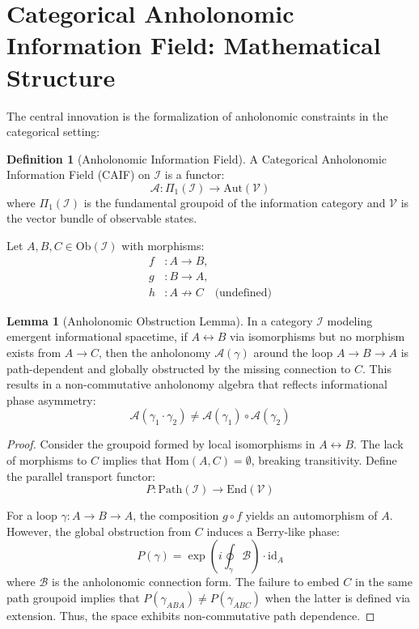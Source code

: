 \documentclass[11pt]{article}
\theoremstyle{definition}
\newtheorem{definition}{Definition}[section]
\newtheorem{lemma}{Lemma}[section]
\theoremstyle{remark}
\begin{document}
\section{Categorical Anholonomic Information Field: Mathematical Structure}

The central innovation is the formalization of anholonomic constraints in the categorical setting:

\begin{definition}[Anholonomic Information Field]
A Categorical Anholonomic Information Field (CAIF) on \( \mathcal{I} \) is a functor:
\[ \mathcal{A}: \Pi_1(\mathcal{I}) \to \text{Aut}(\mathcal{V}) \]
where \( \Pi_1(\mathcal{I}) \) is the fundamental groupoid of the information category and \( \mathcal{V} \) is the vector bundle of observable states.
\end{definition}

Let \( A, B, C \in \text{Ob}(\mathcal{I}) \) with morphisms:
\begin{align*}
  f &: A \to B, \\
  g &: B \to A, \\
  h &: A \nrightarrow C \quad \text{(undefined)}
\end{align*}

\begin{lemma}[Anholonomic Obstruction Lemma]
In a category \( \mathcal{I} \) modeling emergent informational spacetime, if \( A \leftrightarrow B \) via isomorphisms but no morphism exists from \( A \to C \), then the anholonomy \( \mathcal{A}(\gamma) \) around the loop \( A \to B \to A \) is path-dependent and globally obstructed by the missing connection to \( C \). This results in a non-commutative anholonomy algebra that reflects informational phase asymmetry:
\[ \mathcal{A}(\gamma_1 \cdot \gamma_2) \neq \mathcal{A}(\gamma_1) \circ \mathcal{A}(\gamma_2) \]
\end{lemma}

\begin{proof}
Consider the groupoid formed by local isomorphisms in \( A \leftrightarrow B \). The lack of morphisms to \( C \) implies that \( \text{Hom}(A, C) = \emptyset \), breaking transitivity. Define the parallel transport functor:
\[ P: \text{Path}(\mathcal{I}) \to \text{End}(\mathcal{V}) \]

For a loop \( \gamma: A \to B \to A \), the composition \( g \circ f \) yields an automorphism of \( A \). However, the global obstruction from \( C \) induces a Berry-like phase:
\[ P(\gamma) = \exp\left(i\oint_\gamma \mathcal{B}\right) \cdot \text{id}_A \]
where \( \mathcal{B} \) is the anholonomic connection form. The failure to embed \( C \) in the same path groupoid implies that \( P(\gamma_{ABA}) \neq P(\gamma_{ABC}) \) when the latter is defined via extension. Thus, the space exhibits non-commutative path dependence.
\end{proof}
\end{document}
